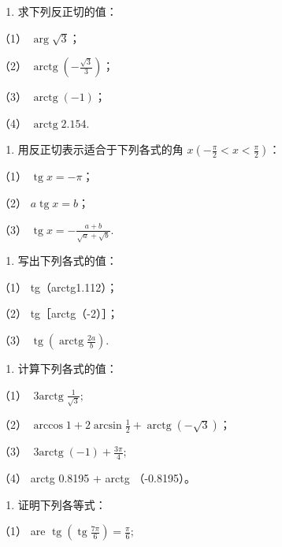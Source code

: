 \begin{enumerate}
\item
  求下列反正切的值：
\end{enumerate}

（1） \(\arg \sqrt{3}\)；

（2） \(\operatorname{arctg}\left(-\frac{\sqrt{3}}{3}\right)\)；

（3） \(\operatorname{arctg}(-1)\)；

（4） \(\operatorname{arctg} 2.154\).

\begin{enumerate}[start=2]
\item
  用反正切表示适合于下列各式的角
  \(x\left(-\frac{\pi}{2} < x < \frac{\pi}{2}\right)\)：
\end{enumerate}

（1） \(\operatorname{tg} x = -\pi\)；

（2） \(a \operatorname{tg} x = b\)；

（3） \(\operatorname{tg} x = -\frac{a + b}{\sqrt{a} + \sqrt{b}}.\)

\begin{enumerate}[start=3]
\item
  写出下列各式的值：
\end{enumerate}

（1） tg（arctg1.112）；

（2） tg［arctg（-2）］；

（3）
\(\operatorname{tg}\left(\operatorname{arctg}\frac{2a}{b}\right)\).

\begin{enumerate}[start=4]
\item
  计算下列各式的值：
\end{enumerate}

（1） \(\operatorname{3arctg}\frac{1}{\sqrt{3}};\)

（2）
\(\operatorname{arccos} 1 + 2\operatorname{arcsin}\frac{1}{2} + \operatorname{arctg}(-\sqrt{3})\)；

（3） \(\operatorname{3arctg}(-1)+\frac{3\pi}{4};\)

（4） arctg 0.8195 + arctg （-0.8195）。

\begin{enumerate}[start=5]
\item
  证明下列各等式：
\end{enumerate}

（1） are
\(\operatorname{tg}\left(\operatorname{tg}\frac{7\pi}{6}\right)=\frac{\pi}{6};\)

